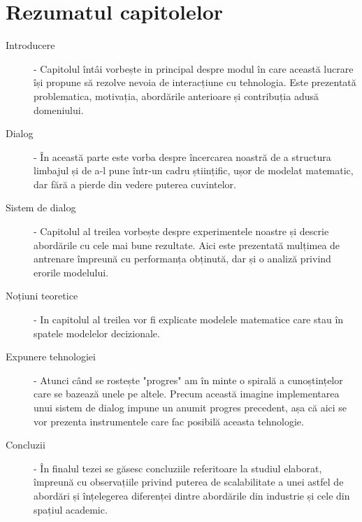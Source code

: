\section{Rezumatul capitolelor}
\begin{description}
	\item[Introducere]  - 
		Capitolul întâi vorbește in principal despre modul în care această lucrare își propune să rezolve nevoia de interacțiune cu tehnologia. Este prezentată problematica, motivația, abordările anterioare și contribuția adusă domeniului.
	\item[Dialog] -
		În această parte este vorba despre încercarea noastră de a structura limbajul și de a-l pune într-un cadru științific, ușor de modelat matematic, dar fără a pierde din vedere puterea cuvintelor.
	\item[Sistem de dialog] - 
		Capitolul al treilea vorbește despre experimentele noastre și descrie abordările cu cele mai bune rezultate. Aici este prezentată mulțimea de antrenare împreună cu performanța obținută, dar și o analiză privind erorile modelului.
	\item[Noțiuni teoretice] -
		In capitolul al treilea vor fi explicate modelele matematice care stau în spatele modelelor decizionale.
	\item[Expunere tehnologiei] - 
		Atunci când se rostește "progres" am în minte o  spirală a cunoștințelor care se bazează unele pe altele. Precum această imagine implementarea unui sistem de dialog impune un anumit progres precedent, așa că aici se vor prezenta instrumentele care fac posibilă aceasta tehnologie.
	\item[Concluzii] -
		În finalul tezei se găsesc concluziile referitoare la studiul elaborat, împreună cu observațiile privind puterea de scalabilitate a unei astfel de abordări și înțelegerea diferenței dintre abordările din industrie și cele din spațiul academic.
\end{description}

